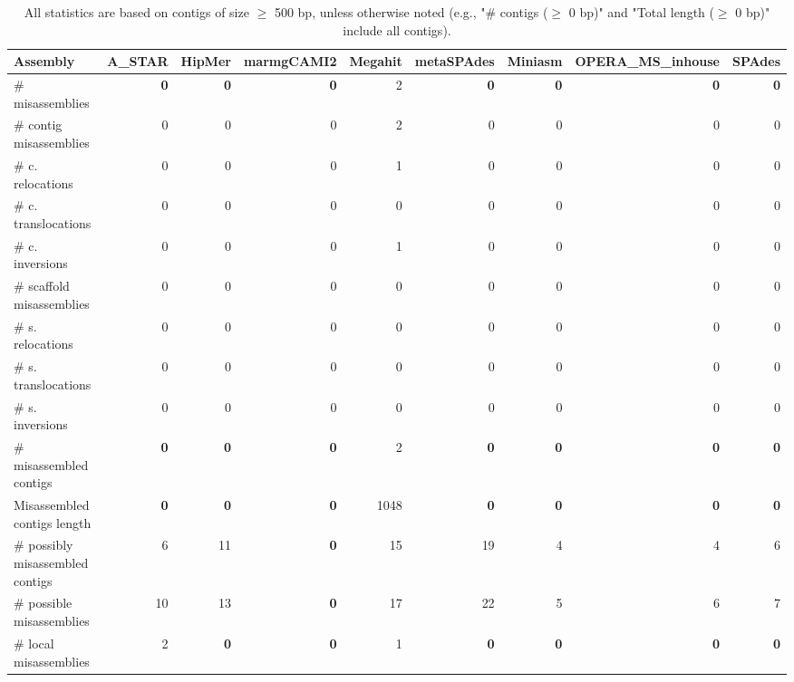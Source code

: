 \documentclass[12pt,a4paper]{article}
\begin{document}
\begin{table}[ht]
\begin{center}
\caption{All statistics are based on contigs of size $\geq$ 500 bp, unless otherwise noted (e.g., "\# contigs ($\geq$ 0 bp)" and "Total length ($\geq$ 0 bp)" include all contigs).}
\begin{tabular}{|l*{8}{|r}|}
\hline
Assembly & A\_STAR & HipMer & marmgCAMI2 & Megahit & metaSPAdes & Miniasm & OPERA\_MS\_inhouse & SPAdes \\ \hline
\# misassemblies & {\bf 0} & {\bf 0} & {\bf 0} & 2 & {\bf 0} & {\bf 0} & {\bf 0} & {\bf 0} \\ \hline
\hspace{2mm}\# contig misassemblies & 0 & 0 & 0 & 2 & 0 & 0 & 0 & 0 \\ \hline
\hspace{5mm}\# c. relocations & 0 & 0 & 0 & 1 & 0 & 0 & 0 & 0 \\ \hline
\hspace{5mm}\# c. translocations & 0 & 0 & 0 & 0 & 0 & 0 & 0 & 0 \\ \hline
\hspace{5mm}\# c. inversions & 0 & 0 & 0 & 1 & 0 & 0 & 0 & 0 \\ \hline
\hspace{2mm}\# scaffold misassemblies & 0 & 0 & 0 & 0 & 0 & 0 & 0 & 0 \\ \hline
\hspace{5mm}\# s. relocations & 0 & 0 & 0 & 0 & 0 & 0 & 0 & 0 \\ \hline
\hspace{5mm}\# s. translocations & 0 & 0 & 0 & 0 & 0 & 0 & 0 & 0 \\ \hline
\hspace{5mm}\# s. inversions & 0 & 0 & 0 & 0 & 0 & 0 & 0 & 0 \\ \hline
\# misassembled contigs & {\bf 0} & {\bf 0} & {\bf 0} & 2 & {\bf 0} & {\bf 0} & {\bf 0} & {\bf 0} \\ \hline
Misassembled contigs length & {\bf 0} & {\bf 0} & {\bf 0} & 1048 & {\bf 0} & {\bf 0} & {\bf 0} & {\bf 0} \\ \hline
\# possibly misassembled contigs & 6 & 11 & {\bf 0} & 15 & 19 & 4 & 4 & 6 \\ \hline
\hspace{5mm}\# possible misassemblies & 10 & 13 & {\bf 0} & 17 & 22 & 5 & 6 & 7 \\ \hline
\# local misassemblies & 2 & {\bf 0} & {\bf 0} & 1 & {\bf 0} & {\bf 0} & {\bf 0} & {\bf 0} \\ \hline

\end{tabular}
\end{center}
\end{table}
\end{document}
